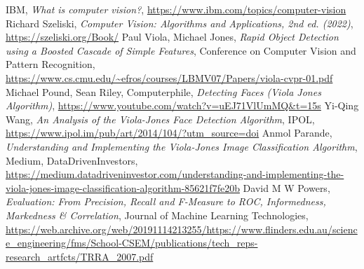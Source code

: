 \documentclass[12pt,a4paper]{article}
\begin{document}
\begin{thebibliography}{9}
    
    IBM, \textit{What is computer vision?}, \url{https://www.ibm.com/topics/computer-vision}
    Richard Szeliski, \textit{Computer Vision: Algorithms and Applications, 2nd ed. (2022)}, \url{https://szeliski.org/Book/}
    Paul Viola, Michael Jones, \textit{Rapid Object Detection using a Boosted Cascade of Simple Features}, Conference on Computer Vision and Pattern Recognition, \url{https://www.cs.cmu.edu/~efros/courses/LBMV07/Papers/viola-cvpr-01.pdf}
    Michael Pound, Sean Riley, Computerphile, \textit{Detecting Faces (Viola Jones Algorithm)}, \url{https://www.youtube.com/watch?v=uEJ71VlUmMQ&t=15s}
    Yi-Qing Wang, \textit{An Analysis of the Viola-Jones Face Detection Algorithm}, IPOL, \url{https://www.ipol.im/pub/art/2014/104/?utm_source=doi}
    Anmol Parande, \textit{Understanding and Implementing the Viola-Jones Image Classification Algorithm}, Medium, DataDrivenInvestors, \url{https://medium.datadriveninvestor.com/understanding-and-implementing-the-viola-jones-image-classification-algorithm-85621f7fe20b}
    David M W Powers, \textit{Evaluation: From Precision, Recall and F-Measure to ROC, Informedness, Markedness \& Correlation}, Journal of Machine Learning Technologies,  \url{https://web.archive.org/web/20191114213255/https://www.flinders.edu.au/science_engineering/fms/School-CSEM/publications/tech_reps-research_artfcts/TRRA_2007.pdf}


\end{thebibliography}
\end{document}
